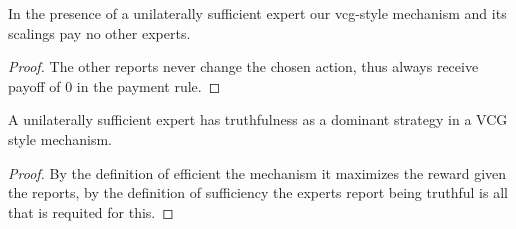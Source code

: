 \begin{lem}
	In the presence of a unilaterally sufficient expert our vcg-style mechanism and its scalings pay no other experts.
\end{lem}

\begin{proof}
    The other reports never change the chosen action, thus always receive payoff of 0 in the payment rule.
\end{proof}


\begin{lem}
	A unilaterally sufficient expert has truthfulness as a dominant strategy in a VCG style mechanism.
\end{lem}

\begin{proof}
    By the definition of efficient the mechanism it maximizes the reward given the reports, by the definition of sufficiency the experts report being truthful is all that is requited for this.
\end{proof}





